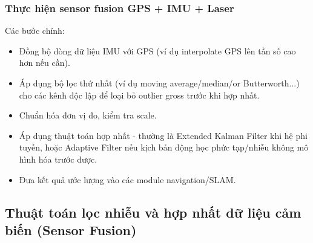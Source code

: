 \subsubsection{Thực hiện sensor fusion GPS + IMU + Laser}
Các bước chính:
\begin{itemize}
    \item Đồng bộ dòng dữ liệu IMU với GPS (ví dụ interpolate GPS lên tần số cao hơn nếu cần).
    \item Áp dụng bộ lọc thứ nhất (ví dụ moving average/median/or Butterworth...) cho các kênh độc lập để loại bỏ outlier gross trước khi hợp nhất.
    \item Chuẩn hóa đơn vị đo, kiểm tra scale.
    \item Áp dụng thuật toán hợp nhất - thường là Extended Kalman Filter khi hệ phi tuyến, hoặc Adaptive Filter nếu kịch bản động học phức tạp/nhiễu không mô hình hóa trước được.
    \item Đưa kết quả ước lượng vào các module navigation/SLAM.
\end{itemize}
\newpage
\subsection{Thuật toán lọc nhiễu và hợp nhất dữ liệu cảm biến (Sensor Fusion)}
